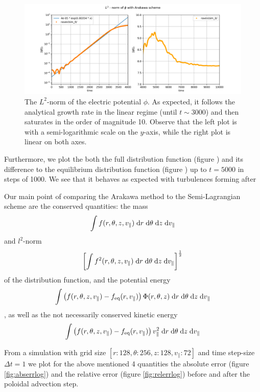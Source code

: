\begin{figure}
	\centering
	\includegraphics[width=\linewidth]{plots/L2phi}
	\caption{The $L^2$-norm of the electric potential $\phi$. As expected, it follows the analytical growth rate in the linear regime (until $t\sim 3000$) and then saturates in the order of magnitude 10. Observe that the left plot is with a semi-logarithmic scale on the $y$-axis, while the right plot is linear on both axes.}
	\label{fig:l2phi}
\end{figure}


Furthermore, we plot the both the full distribution function (figure ) and its difference to the equilibrium distribution function (figure ) up to $t=5000$ in steps of 1000. We see that it behaves as expected with turbulences forming after



Our main point of comparing the Arakawa method to the Semi-Lagrangian scheme are the conserved quantities: the mass
\begin{equation}
	\int f(r, \theta, z, v_\parallel) \;\text{d} r \;\text{d} \theta \;\text{d} z \;\text{d} v_\parallel
\end{equation}
and $l^2$-norm
\begin{equation}
	\left[\int f^2(r, \theta, z, v_\parallel) \;\text{d} r \;\text{d} \theta \;\text{d} z \;\text{d} v_\parallel\right]^\frac{1}{2}
\end{equation}
of the distribution function, and the potential energy
\begin{equation}
	\int \left(f(r, \theta, z, v_\parallel) - f_\text{eq}(r, v_\parallel)\right) \Phi(r, \theta, z) \;\text{d} r \;\text{d} \theta \;\text{d} z \;\text{d} v_\parallel
\end{equation}
, as well as the not necessarily conserved kinetic energy
\begin{equation}
	\int \left(f(r, \theta, z, v_\parallel) - f_\text{eq}(r, v_\parallel)\right) v^2_\parallel \;\text{d} r \;\text{d} \theta \;\text{d} z \;\text{d} v_\parallel
\end{equation}

From a simulation with grid size $[r:128, \theta:256, z:128, v_\parallel :72]$ and time step-size $\Delta t = 1$ we plot for the above mentioned 4 quantities the absolute error (figure \ref{fig:abserrlog}) and the relative error (figure \ref{fig:relerrlog}) before and after the poloidal advection step.

